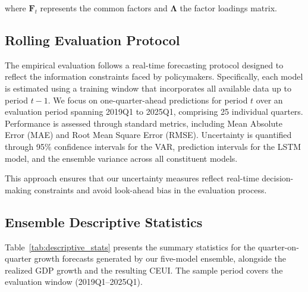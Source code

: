 \documentclass[12pt,a4paper]{article}
\theoremstyle{remark}
\begin{document}
where $\mathbf{F}_t$ represents the common factors and $\boldsymbol{\Lambda}$ the factor loadings matrix.

\subsection{Rolling Evaluation Protocol}

The empirical evaluation follows a real-time forecasting protocol designed to reflect the information constraints faced by policymakers. Specifically, each model is estimated using a training window that incorporates all available data up to period $t-1$. We focus on one-quarter-ahead predictions for period $t$ over an evaluation period spanning 2019Q1 to 2025Q1, comprising 25 individual quarters. Performance is assessed through standard metrics, including Mean Absolute Error (MAE) and Root Mean Square Error (RMSE). Uncertainty is quantified through 95\% confidence intervals for the VAR, prediction intervals for the LSTM model, and the ensemble variance across all constituent models.

This approach ensures that our uncertainty measures reflect real-time decision-making constraints and avoid look-ahead bias in the evaluation process.

\subsection{Ensemble Descriptive Statistics}
\label{sec:stats_ensemble}

Table~\ref{tab:descriptive_stats} presents the summary statistics for the quarter-on-quarter growth forecasts generated by our five-model ensemble, alongside the realized GDP growth and the resulting CEUI. The sample period covers the evaluation window (2019Q1--2025Q1).
\end{document}
